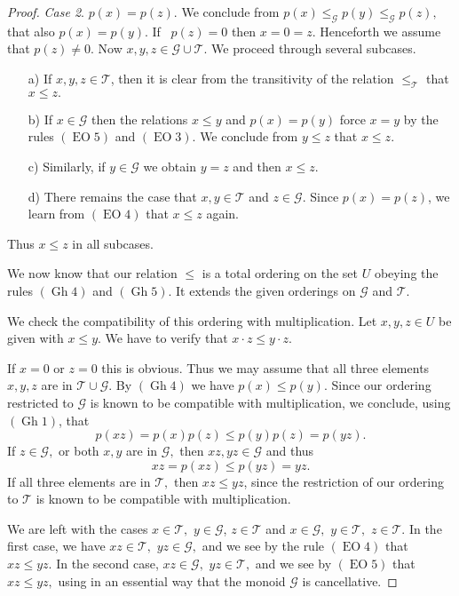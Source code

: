 \documentclass [12pt,a4paper,reqno]{amsart}
\begin{document}
\begin{proof}
\textit{Case 2}. $p(x)=p(z).$ We conclude from $p(x)\le_{\mathcal G}
p(y)\le_{\mathcal G} p(z),$ that also $p(x)=p(y). $ If ~$p(z)=0$ then
$x=0=z.$ Henceforth we assume that $p(z)\ne0.$ Now $x,y,z\in{\mathcal G}
\cup {\mathcal T}.$ We proceed through several subcases.

\begin{enumerate}
    \item[a)] If $x,y,z\in {\mathcal T}$, then it is clear from the transitivity of the
relation $\le_{\mathcal T} $ that $x\le z.$

\item[b)] If $x\in{\mathcal G} $ then the relations $x\le y$ and
$p(x)=p(y)$ force $x=y$ by the rules $({\operatorname{EO}}5)$ and $({\operatorname{EO}}3)$. We
conclude from $y\le z$ that $x\le z.$

\item[c)] Similarly, if $y\in{\mathcal G} $ we obtain $y=z$ and then
$x\le z.$

\item[d)] There remains the case that $x,y\in {\mathcal T}$ and $z\in{\mathcal G} .$ Since $p(x)=p(z)$, we learn from
$({\operatorname{EO}}4)$ that $x\le z$ again.
\end{enumerate}

Thus $x\le z$ in all subcases.

We now know that our relation $\le$ is a total ordering on the set
$U$ obeying the rules $({\operatorname{Gh}}4)$ and $({\operatorname{Gh}}5)$. It extends the given
orderings on ${\mathcal G} $ and ${\mathcal T}.$

We check the compatibility of this ordering with multiplication.
Let $x,y,z\in U$ be given with $x\le y.$ We have to verify that
$x\cdot z \le y\cdot z.$

If $x=0$ or $z=0$ this is obvious. Thus we may assume that all
three elements $x,y,z$ are in ${\mathcal T}\cup{\mathcal G} .$ By $({\operatorname{Gh}}4)$ we have
$p(x)\le p(y).$ Since our ordering restricted to ${\mathcal G} $ is known
to be compatible  with multiplication, we conclude, using
$({\operatorname{Gh}}1)$, that
$$p(xz)=p(x)p(z)\le p(y)p(z)=p(yz).$$
If $z\in{\mathcal G} ,$ or both $x,y$ are in ${\mathcal G} ,$ then $xz,yz\in{\mathcal G} $
and thus
$$xz=p(xz)\le p(yz)=yz.$$
If all three elements are in ${\mathcal T},$ then $xz\le yz$, since the
restriction of our ordering to ${\mathcal T}$ is known to be compatible
with multiplication.

We are left with the cases $x\in {\mathcal T},$ $y\in{\mathcal G} $, $z\in {\mathcal T}$ and
$x\in{\mathcal G} ,$ $y\in {\mathcal T},$ $z\in {\mathcal T}.$ In the first case, we have
$xz\in {\mathcal T}, $ $yz\in{\mathcal G} ,$ and we see by the rule $({\operatorname{EO}}4)$ that
$xz\le yz.$ In the second case, $xz\in{\mathcal G} ,$ $yz\in {\mathcal T},$ and we
see by $({\operatorname{EO}}5)$ that $xz\le yz,$ using in an essential way that
the monoid ${\mathcal G} $ is cancellative.


\end{proof}
\end{document}
